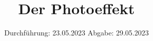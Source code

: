

\subject{V500}
\title{Der Photoeffekt}
\date{%
  Durchführung: 23.05.2023
  \hspace{3em}
  Abgabe: 29.05.2023
}



\maketitle
\thispagestyle{empty}
\tableofcontents
\newpage






\printbibliography{}


